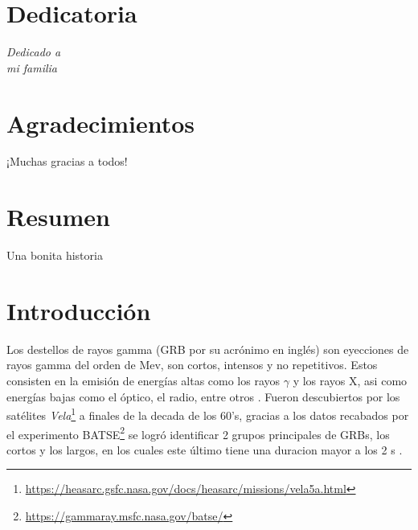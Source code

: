 \documentclass[12pt,a4paper]{book}
\begin{document}
\chapter*{Dedicatoria}

%
\begin{flushright}
\textit{Dedicado a \\
mi familia}
\end{flushright}

%
\chapter*{Agradecimientos} %
 
¡Muchas gracias a todos!

\chapter*{Resumen} %

%
Una bonita historia
%
%
%

\chapter{Introducción}


Los destellos de rayos gamma (GRB por su acrónimo en inglés) son eyecciones de rayos gamma del orden de Mev, son cortos, intensos y no repetitivos.
Estos consisten en la emisión de energías altas como los rayos $\gamma$ y los rayos X, asi como energías bajas como el óptico, el radio, entre otros \cite{PGRB-piran}. %
Fueron descubiertos por los satélites \emph{Vela}\footnote{\url{https://heasarc.gsfc.nasa.gov/docs/heasarc/missions/vela5a.html}} a finales de la decada de los 60's, gracias a los datos recabados por el experimento BATSE\footnote{\url{https://gammaray.msfc.nasa.gov/batse/}} se logró identificar 2 grupos principales de GRBs, los cortos y los largos, en los cuales este último tiene una duracion mayor a los 2 s \cite{Berger:2013jza}.
\end{document}
